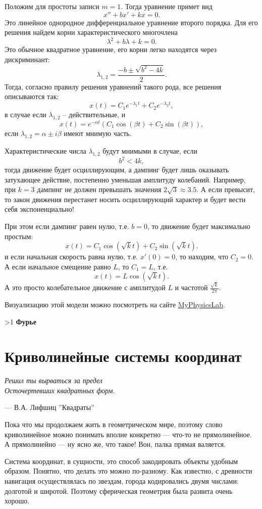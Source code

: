 \documentclass[a4paper,12pt]{article}
\newcommand{\la}{\lambda}
\newcounter{th-counter}
\newcounter{col-counter}
\newcounter{subpoint}[subsection]
\renewcommand{\thesubpoint}{\arabic{subpoint}}
\newcommand{\subpoint}[1]{%
  \refstepcounter{subpoint}%
  \ifnum\value{subpoint}>1
    \vspace{1em}%
  \fi
  \noindent\textbf{%
    \fcolorbox{black}{white}{\thesubpoint}\quad #1}%
  \par\vspace{0.2em}%
}
\begin{document}
Положим для простоты записи $m = 1$. Тогда уравнение примет вид
\[
x'' + bx' + kx = 0.
\]
Это линейное однородное дифференциальное уравнение второго порядка. Для его решения найдем корни характеристического многочлена
\[
\la^2 + b\la + k = 0.
\]
Это обычное квадратное уравнение, его корни легко находятся через дискриминант:
\[
\la_{1,2} = \frac{-b \pm \sqrt{b^2 - 4k}}{2}.
\]
Тогда, согласно правилу решения уравнений такого рода, все решения описываются так:
\[
x(t) = C_1 e^{-\la_1t} + C_2 e^{-\la_2t},
\]
в случае если $\la_{1,2}$ -- действительные, и
\[
x(t) = e^{-\alpha t}(C_1 \cos(\beta t) + C_2 \sin(\beta t)),
\]
если $\la_{1,2} = \alpha \pm i\beta$ имеют мнимую часть.

Характеристические числа $\la_{1,2}$ будут мнимыми в случае, если
\[
b^2 < 4k,
\]
тогда движение будет осциллирующим, а дампинг будет лишь оказывать затухающее действие, постепенно уменьшая амплитуду колебаний. Например, при $k=3$ дампинг не должен превышать значения $2\sqrt 3 \approx 3.5$. А если превысит, то закон движения перестанет носить осциллирующий характер и будет вести себя экспоненциально!

При этом если дампинг равен нулю, т.е. $b = 0$, то движение будет максимально простым:
\[
x(t) = C_1 \cos(\sqrt{k}t) + C_2 \sin(\sqrt{k}t).
\]
и если начальная скорость равна нулю, т.е. $x'(0) = 0$, то находим, что $C_2 = 0$. А если начальное смещение равно $L$, то $C_1 = L$, т.е.
\[
x(t) = L\cos(\sqrt{k}t).
\]
А это просто колебательное движение с амплитудой $L$ и частотой $\frac{\sqrt{k}}{2\pi}$.

Визуализацию этой модели можно посмотреть на сайте \href{https://www.myphysicslab.com/springs/single-spring-en.html}{MyPhysicsLab}.

\subpoint{Фурье}



\section*{Криволинейные системы координат}
\epigraph{\textit{Решил ты вырваться за предел \\
Осточертевших квадратных форм.}}{— В.А. Лифшиц ''Квадраты''}

Пока что мы продолжаем жить в геометрическом мире, поэтому слово криволинейное можно понимать вполне конкретно --- что-то не прямолинейное. А прямолинейно --- ну ясно же, что такое! Вон, палка прямая валяется.

Система координат, в сущности, это способ закодировать объекты удобным образом. Понятно, что делать это можно по-разному. Как известно, с древности навигация осуществлялась по звездам, города кодировались двумя числами: долготой и широтой. Поэтому сферическая геометрия была развита очень хорошо.
\end{document}
